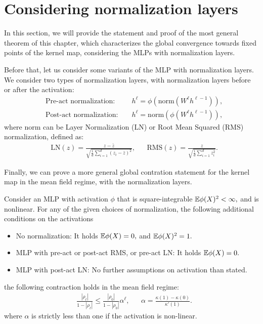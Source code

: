 \section{Considering normalization layers}

In this section, we will provide the statement and proof of the most general theorem of this chapter, which characterizes the global convergence towards fixed points of the kernel map, considering the MLPs with normalization layers. 

Before that, let us consider some variants of the MLP with normalization layers. We consider two types of normalization layers, with normalization layers before or after the activation: 
\begin{align}
    & \text{Pre-act normalization: } &&h^\ell = \phi\left(\text{norm}\left(W^\ell h^{\ell-1}\right)\right), \\
    & \text{Post-act normalization: } &&h^\ell = \text{norm}\left(\phi\left(W^\ell h^{\ell-1}\right)\right), 
\end{align}
where $\text{norm}$ can be Layer Normalization (LN) or Root Mean Squared (RMS) normalization, defined as:
\begin{align}
    &\text{LN}(z) = \frac{z - \bar{z}}{\sqrt{\frac1d \sum_{i=1}^d (z_i - \bar{z})^2}}, && \text{RMS}(z) = \frac{z}{\sqrt{\frac1d \sum_{i=1}^d z_i^2}}.
\end{align}


    
Finally, we can prove a more general global contration statement for the kernel map  in the mean field regime, with the normalization layers.

\begin{theorem}
\label{iso:thm:global_attract_norm}
Consider an MLP with activation $\phi$ that is square-integrable $\mathbb{E} \phi(X)^2 < \infty,$ and is nonlinear. For any of the given choices of normalization, the following additional conditions on the activations
\begin{itemize}
\item No normalization: It holds $\mathbb{E} \phi(X) = 0,$ and $\mathbb{E} \phi(X)^2 = 1.$
\item MLP with pre-act or post-act RMS, or pre-act LN: It holds $\mathbb{E} \phi(X) = 0.$
\item MLP with post-act LN: No further assumptions on activation than stated.
\end{itemize}
the following contraction holds in the mean field regime:
\begin{align}
    &\frac{|\rho_\ell|}{1-|\rho_\ell|} \le  \frac{|\rho_0|}{1-|\rho_0|} \alpha^{\ell}, && \alpha = \frac{\kappa(1)-\kappa(0)}{\kappa'(1)}.
\end{align}
where $\alpha$ is strictly less than one if the activation is non-linear.
\end{theorem}

